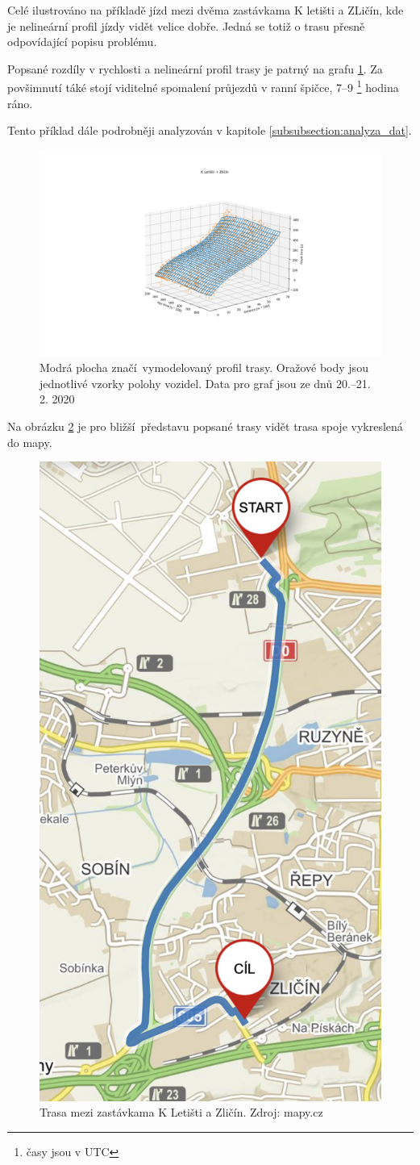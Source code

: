 Celé ilustrováno na příkladě jízd mezi dvěma zastávkama K letišti a ZLičín, kde je nelineární profil jízdy vidět velice dobře. Jedná se totiž o trasu přesně odpovídající popisu problému.

\bigbreak

Popsané rozdíly v rychlosti a nelineární profil trasy je patrný na grafu \ref{fig:k_letisti_to_zlicin_3d}. Za povšimnutí táké stojí viditelné spomalení průjezdů v ranní špičce, 7--9 \footnote{časy jsou v UTC} hodina ráno.

\bigbreak

Tento příklad dále podrobněji analyzován v kapitole \ref{subsubsection:analyza_dat}.

\begin{figure}
  \includegraphics[width=\linewidth]{../img/k_letisti_to_zlicin_3d.png}
  \caption{Modrá plocha značí vymodelovaný profil trasy. Oražové body jsou jednotlivé vzorky polohy vozidel. Data pro graf jsou ze dnů 20.--21. 2. 2020}
  \label{fig:k_letisti_to_zlicin_3d}
\end{figure}

\bigbreak

Na obrázku \ref{fig:k_letisti_to_zlicin_map} je pro bližší představu popsané trasy vidět trasa spoje vykreslená do mapy.

\begin{figure}
	\centering
  \includegraphics[width=0.3\linewidth]{../img/k_letisti_to_zlicin_map.png}
  \caption{Trasa mezi zastávkama K Letišti a Zličín. Zdroj: mapy.cz}
  \label{fig:k_letisti_to_zlicin_map}
\end{figure}

